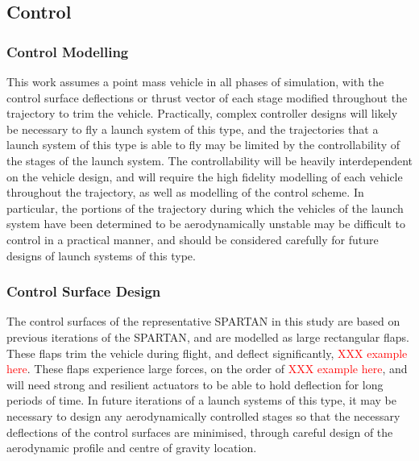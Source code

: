 \subsection{Control}


\subsubsection{Control Modelling}
This work assumes a point mass vehicle in all phases of simulation, with the control surface deflections or thrust vector of each stage modified throughout the trajectory to trim the vehicle. Practically, complex controller designs will likely be necessary to fly a launch system of this type, and the trajectories that a launch system of this type is able to fly may be limited by the controllability of the stages of the launch system. The controllability will be heavily interdependent on the vehicle design, and will require the high fidelity modelling of each vehicle throughout the trajectory, as well as modelling of the control scheme. In particular, the portions of the trajectory during which the vehicles of the launch system have been determined to be aerodynamically unstable may be difficult to control in a practical manner, and should be considered carefully for future designs of launch systems of this type. 




\subsubsection{Control Surface Design}



The control surfaces of the representative SPARTAN in this study are based on previous iterations of the SPARTAN\cite{Preller2017b}, and are modelled as large rectangular flaps. These flaps trim the vehicle during flight, and deflect significantly, \textcolor{red}{XXX example here}. These flaps experience large forces, on the order of \textcolor{red}{XXX example here}, and will need strong and resilient actuators to be able to hold deflection for long periods of time. In future iterations of a launch systems of this type, it may be necessary to design any aerodynamically controlled stages so that the necessary deflections of the control surfaces are minimised, through careful design of the aerodynamic profile and centre of gravity location.

